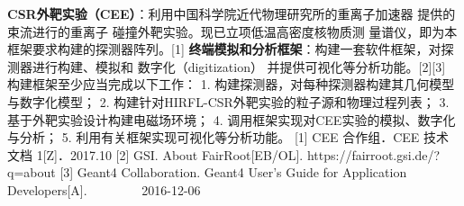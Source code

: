 \assignReq
{\textbf{CSR外靶实验（CEE）}：利用中国科学院近代物理研究所的重离子加速器}
{提供的束流进行的重离子 碰撞外靶实验。现已立项低温高密度核物质测}
{量谱仪，即为本框架要求构建的探测器阵列。[1]}
{\textbf{终端模拟和分析框架}：构建一套软件框架，对探测器进行构建、模拟和}
{数字化（digitization） 并提供可视化等分析功能。[2][3]}
\assignWork
{构建框架至少应当完成以下工作：}
{1. 构建探测器，对每种探测器构建其几何模型与数字化模型；}
{2. 构建针对HIRFL-CSR外靶实验的粒子源和物理过程列表；}
{3. 基于外靶实验设计构建电磁场环境；}
{4. 调用框架实现对CEE实验的模拟、数字化与分析；}
{5. 利用有关框架实现可视化等分析功能。}
\assignRef
{[1] CEE 合作组．CEE 技术文档 1[Z]．2017.10}
{[2] GSI. About FairRoot[EB/OL]. https://fairroot.gsi.de/?q=about}
{[3] Geant4 Collaboration. Geant4 User's Guide for Application Developers[A].}
{\ \ \ \ \ \ \ \ 2016-12-06}
{}
{}
{}
{}
